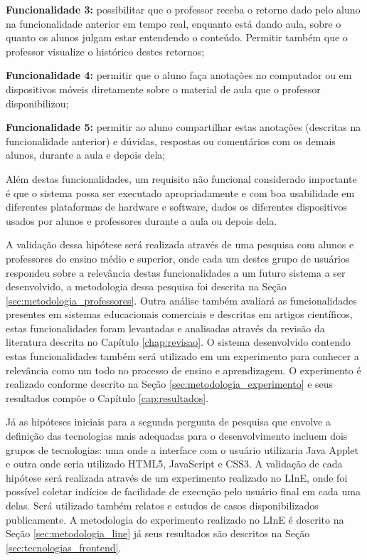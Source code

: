 \textbf{Funcionalidade 3:} possibilitar que o professor receba o retorno dado pelo aluno na funcionalidade anterior em tempo real, enquanto está dando aula, sobre o quanto os alunos julgam estar entendendo o conteúdo. Permitir também que o professor visualize o histórico destes retornos;

\textbf{Funcionalidade 4:} permitir que o aluno faça anotações no computador ou em dispositivos móveis diretamente sobre o material de aula que o professor disponibilizou;

\textbf{Funcionalidade 5:} permitir ao aluno compartilhar estas anotações (descritas na funcionalidade anterior) e dúvidas, respostas ou comentários com os demais alunos, durante a aula e depois dela;

Além destas funcionalidades, um requisito não funcional considerado importante é que o sistema possa ser executado apropriadamente e com boa usabilidade em diferentes plataformas de hardware e software, dados os diferentes dispositivos usados por alunos e professores durante a aula ou depois dela.

A validação dessa hipótese será realizada através de uma pesquisa com alunos e professores do ensino médio e superior, onde cada um destes grupo de usuários respondeu sobre a relevância destas funcionalidades a um futuro sistema a ser desenvolvido, a metodologia dessa pesquisa foi descrita na Seção \ref{sec:metodologia_professores}. Outra análise também avaliará as funcionalidades presentes em sistemas educacionais comerciais e descritas em artigos científicos, estas funcionalidades foram levantadas e analisadas através da revisão da literatura descrita no Capítulo \ref{chap:revisao}. O sistema desenvolvido contendo estas funcionalidades também será utilizado em um experimento para conhecer a relevância como um todo no processo de ensino e aprendizagem. O experimento é realizado conforme descrito na Seção \ref{sec:metodologia_experimento} e seus resultados compõe o Capítulo \ref{cap:resultados}.

Já as hipóteses iniciais para a segunda pergunta de pesquisa que envolve a definição das tecnologias mais adequadas para o desenvolvimento incluem dois grupos de tecnologias: uma onde a interface com o usuário utilizaria Java Applet e outra onde seria utilizado HTML5, JavaScript e CSS3. A validação de cada hipótese será realizada através de um experimento realizado no LInE, onde foi possível coletar indícios de facilidade de execução pelo usuário final em cada uma delas. Será utilizado também relatos e estudos de casos disponibilizados publicamente. A metodologia do experimento realizado no LInE é descrito na Seção \ref{sec:metodologia_line} já seus resultados são descritos na Seção \ref{sec:tecnologias_frontend}.


